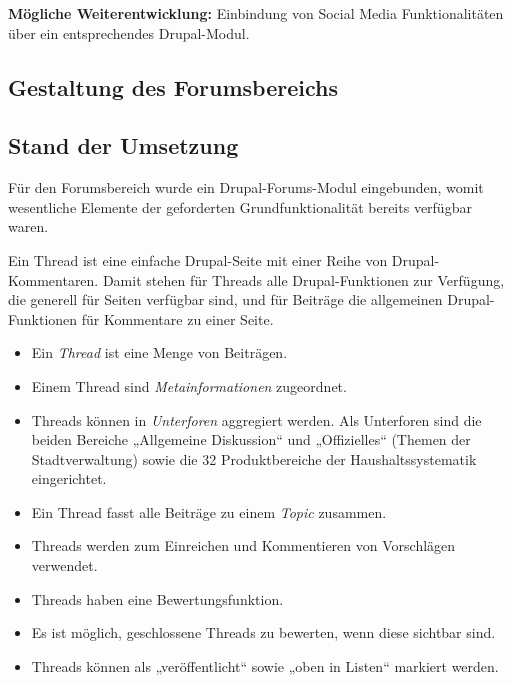 \documentclass[11pt,a4paper,twoside]{article}
\begin{document}
\textbf{Mögliche Weiterentwicklung:} Einbindung von Social Media
Funktionalitäten über ein entsprechendes Drupal-Modul.

\subsection{Gestaltung des Forumsbereichs} 

\subsection*{Stand der Umsetzung} 

Für den Forumsbereich wurde ein Drupal-Forums-Modul eingebunden, womit
wesentliche Elemente der geforderten Grundfunktionalität bereits verfügbar
waren. 

Ein Thread ist eine einfache Drupal-Seite mit einer Reihe von
Drupal-Kommentaren.  Damit stehen für Threads alle Drupal-Funktionen zur
Verfügung, die generell für Seiten verfügbar sind, und für Beiträge die
allgemeinen Drupal-Funktionen für Kommentare zu einer Seite.

\begin{itemize}\itemsep0pt
\item Ein \emph{Thread} ist eine Menge von Beiträgen. 
\item Einem Thread sind \emph{Metainformationen} zugeordnet.
\item Threads können in \emph{Unterforen} aggregiert werden. Als Unterforen
  sind die beiden Bereiche „Allgemeine Diskussion“ und „Offizielles“ (Themen
  der Stadtverwaltung) sowie die 32 Produktbereiche der Haushaltssystematik
  eingerichtet.
\item Ein Thread fasst alle Beiträge zu einem \emph{Topic} zusammen. 
\item Threads werden zum Einreichen und Kommentieren von Vorschlägen verwendet.
\item Threads haben eine Bewertungsfunktion.
\item Es ist möglich, geschlossene Threads zu bewerten, wenn diese sichtbar
  sind.  
\item Threads können als „veröffentlicht“ sowie „oben in Listen“ markiert
  werden.  
\end{itemize}
\end{document}
